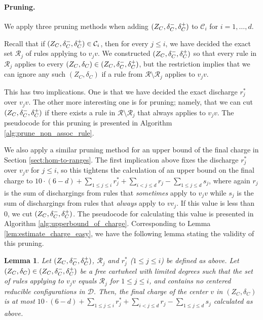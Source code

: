 \documentclass[10pt,a4paper]{article}
\newtheorem{lem}[thm]{Lemma}
\def\cR{{\mathcal R}}
\begin{document}
\paragraph{Pruning.}

We apply three pruning methods when adding $(Z_C, \delta_C^-, \delta_C^+)$ to $\mathcal{C}_i$ for $i=1,\ldots,d$.

Recall that if $(Z_C, \delta_C^-, \delta_C^+) \in \mathcal{C}_{i}$, then for every $j\leq i$, we have decided the exact set $\cR_j$ of rules applying to $v_jv$. We constructed 
$(Z_C, \delta_C^-, \delta_C^+)$ so that every
rule in $\cR_j$ applies
to every 
$(Z_C,\delta_C)\in(Z_C, \delta_C^-, \delta_C^+)$, but the restriction
implies that we can ignore any
such $(Z_C,\delta_C)$ if a rule from $\cR\setminus\cR_j$ applies
to $v_jv$.

This has two implications. One is that we have decided the exact discharge $r^*_j$ over $v_jv$. The other more interesting one is for pruning; namely, that we can 
cut $(Z_C, \delta_C^-, \delta_C^+)$ if there exists a rule in $\mathcal{R} \setminus \mathcal{R}_j$ that always applies to $v_jv$.
The pseudocode for this pruning is presented in Algorithm \ref{alg:prune_non_assoc_rule}.

We also apply a similar pruning method for an upper bound of the final charge in Section \ref{sect:hom-to-ranges}.
The first implication above fixes the discharge $r^*_j$ over $v_jv$ for $j\leq i$, so this tightens the calculation of an upper bound on the final charge to $10 \cdot (6-d) + \sum_{1 \leq j \leq i} r_j^* + \sum_{i < j \leq d} r_j - \sum_{1 \leq j \leq d} s_j$, where again $r_j$ is the sum of dischargings from rules that \emph{sometimes} apply to $v_jv$ while $s_j$ is the sum of dischargings from rules that \emph{always} apply to $vv_j$.
If this value is less than $0$, we cut $(Z_C, \delta_C^-, \delta_C^+)$.
The pseudocode for calculating this value is presented in Algorithm \ref{alg:upperbound_of_charge}.
Corresponding to Lemma
\ref{lem:estimate_charge_easy}, we have the following lemma stating the validity of this pruning.

\begin{lem}
\label{lem:estimate_charge}
    Let $(Z_C, \delta_C^-, \delta_C^+)$, $\mathcal{R}_j$ and $r^*_j$ ($1 \leq j \leq i$) be defined as above.
    Let $(Z_C, \delta_C) \in (Z_C, \delta_C^-, \delta_C^+)$ be a free cartwheel with limited degrees such that the set of rules applying to $v_jv$ equals $\mathcal{R}_j$ for $1 \leq j \leq i$, and contains no centered reducible configurations in $\mathcal{D}$.
    Then, the final charge of the center $v$ in $(Z_C, \delta_C)$ is at most $10 \cdot (6-d) + \sum_{1 \leq j \leq i} r_j^* + \sum_{i < j \leq d} r_j - \sum_{1 \leq j \leq d} s_j$ calculated as above.
\end{lem}
\end{document}

